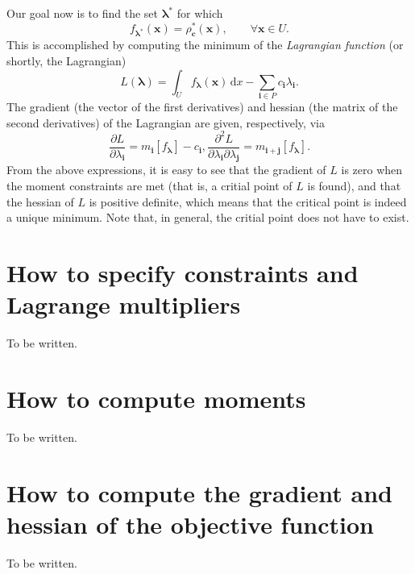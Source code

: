 \documentclass[12pt]{amsart}
\numberwithin{equation}{section}
\newcommand\BS{\boldsymbol}
\newcommand\dif{\,\mathrm{d}}
\newcommand\parderiv[2]{\frac{\partial #1}{\partial #2}}
\begin{document}
Our goal now is to find the set $\BS\lambda^*$ for which
%
\begin{equation}
f_{\BS\lambda^*}(\BS x)=\rho_{\BS c}^*(\BS x), \qquad\forall\BS x\in
U.
\end{equation}
%
This is accomplished by computing the minimum of the {\em Lagrangian
  function} (or shortly, the Lagrangian)
%
\begin{equation}
\label{eq:lagrangian}
L(\BS\lambda)=\int_U f_{\BS\lambda}(\BS x)\dif x-\sum_{\BS i\in
  P}c_{\BS i}\lambda_{\BS i}.
\end{equation}
%
The gradient (the vector of the first derivatives) and hessian (the
matrix of the second derivatives) of the Lagrangian are given,
respectively, via
%
\begin{subequations}
\begin{equation}
\parderiv L{\lambda_{\BS i}}=m_{\BS i}[f_{\BS\lambda}]-c_{\BS i},
\end{equation}
\begin{equation}
\parderiv{^2 L}{\lambda_{\BS i}\partial\lambda_{\BS j}}=m_{\BS i+\BS
  j}[f_{\BS\lambda}].
\end{equation}
\end{subequations}
%
From the above expressions, it is easy to see that the gradient of $L$
is zero when the moment constraints are met (that is, a critial point
of $L$ is found), and that the hessian of $L$ is positive definite,
which means that the critical point is indeed a unique minimum. Note
that, in general, the critial point does not have to exist.


\section{How to specify constraints and Lagrange multipliers}

To be written.

\section{How to compute moments}

To be written.

\section{How to compute the gradient and hessian of the objective function}

To be written.
\end{document}
